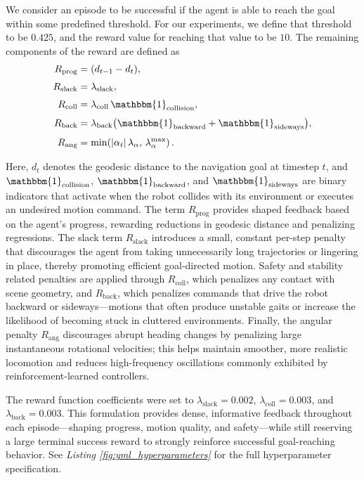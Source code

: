 \documentclass{article} %
\begin{document}
We consider an episode to be successful if the agent is able to reach the goal within some predefined threshold. For our experiments, we define that threshold to be $0.425$, and the reward value for reaching that value to be $10$. The remaining components of the reward are defined as
\begin{align}
R_{\text{prog}} &= (d_{t-1} - d_t), \\[3pt]
R_{\text{slack}} &=\lambda_{\text{slack}}, \\[3pt]
R_{\text{coll}} &=\lambda_{\text{coll}}\,\mathbbm{1}_{\text{collision}}, \\[3pt]
R_{\text{back}} &=\lambda_{\text{back}}\big(\mathbbm{1}_{\text{backward}} + \mathbbm{1}_{\text{sideways}}\big), \\[3pt]
R_{\text{ang}} &=\min\!\left(|\alpha_t|\,\lambda_{\alpha},\,\lambda_{\alpha}^{\max}\right).
\end{align}

Here, $d_t$ denotes the geodesic distance to the navigation goal at timestep $t$, and
$\mathbbm{1}_{\text{collision}}$, $\mathbbm{1}_{\text{backward}}$, and $\mathbbm{1}_{\text{sideways}}$ are binary indicators that activate when the robot collides with its environment or executes an undesired motion command.
The term $R_{\text{prog}}$ provides shaped feedback based on the agent's progress, rewarding reductions in geodesic distance and penalizing regressions.
The slack term $R_{\text{slack}}$ introduces a small, constant per-step penalty that discourages the agent from taking unnecessarily long trajectories or lingering in place, thereby promoting efficient goal-directed motion.
Safety and stability related penalties are applied through $R_{\text{coll}}$, which penalizes any contact with scene geometry, and $R_{\text{back}}$, which penalizes commands that drive the robot backward or sideways—motions that often produce unstable gaits or increase the likelihood of becoming stuck in cluttered environments.
Finally, the angular penalty $R_{\text{ang}}$ discourages abrupt heading changes by penalizing large instantaneous rotational velocities; this helps maintain smoother, more realistic locomotion and reduces high-frequency oscillations commonly exhibited by reinforcement-learned controllers.

The reward function coefficients were set to $\lambda_{\text{slack}} = 0.002$, $\lambda_{\text{coll}} = 0.003$, and $\lambda_{\text{back}} = 0.003$.
This formulation provides dense, informative feedback throughout each episode—shaping progress, motion quality, and safety—while still reserving a large terminal success reward to strongly reinforce successful goal-reaching behavior.
See \textit{Listing \ref{fig:yml_hyperparameters}} for the full hyperparameter specification.
\end{document}
